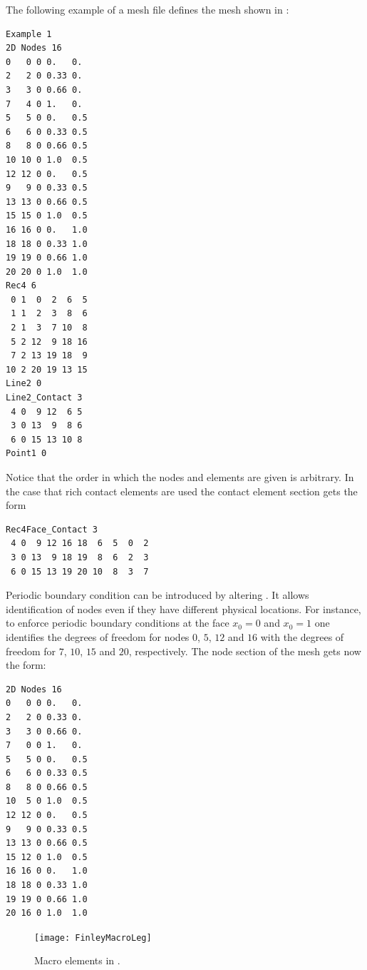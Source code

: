 The following example of a mesh file defines the mesh shown in :
\begin{verbatim}
Example 1
2D Nodes 16
0   0 0 0.   0.
2   2 0 0.33 0.
3   3 0 0.66 0.
7   4 0 1.   0.
5   5 0 0.   0.5
6   6 0 0.33 0.5
8   8 0 0.66 0.5
10 10 0 1.0  0.5
12 12 0 0.   0.5
9   9 0 0.33 0.5
13 13 0 0.66 0.5
15 15 0 1.0  0.5
16 16 0 0.   1.0
18 18 0 0.33 1.0
19 19 0 0.66 1.0
20 20 0 1.0  1.0
Rec4 6
 0 1  0  2  6  5
 1 1  2  3  8  6
 2 1  3  7 10  8
 5 2 12  9 18 16
 7 2 13 19 18  9
10 2 20 19 13 15
Line2 0
Line2_Contact 3
 4 0  9 12  6 5
 3 0 13  9  8 6
 6 0 15 13 10 8
Point1 0
\end{verbatim}
Notice that the order in which the nodes and elements are given is arbitrary.
In the case that rich contact elements are used the contact element section gets
 the form
\begin{verbatim}
Rec4Face_Contact 3
 4 0  9 12 16 18  6  5  0  2
 3 0 13  9 18 19  8  6  2  3
 6 0 15 13 19 20 10  8  3  7
\end{verbatim}
Periodic boundary condition  can be introduced by altering .
It allows identification of nodes even if they have different physical locations. For instance, to
enforce periodic boundary conditions at the face $x_0=0$ and $x_0=1$ one identifies
the degrees of freedom for nodes $0$, $5$, $12$ and $16$ with the degrees of freedom for
$7$, $10$, $15$ and $20$, respectively. The node section of the \finley mesh gets now the form:
\begin{verbatim}
2D Nodes 16
0   0 0 0.   0.
2   2 0 0.33 0.
3   3 0 0.66 0.
7   0 0 1.   0.
5   5 0 0.   0.5
6   6 0 0.33 0.5
8   8 0 0.66 0.5
10  5 0 1.0  0.5
12 12 0 0.   0.5
9   9 0 0.33 0.5
13 13 0 0.66 0.5
15 12 0 1.0  0.5
16 16 0 0.   1.0
18 18 0 0.33 1.0
19 19 0 0.66 1.0
20 16 0 1.0  1.0
\end{verbatim}

\clearpage

\clearpage

\begin{figure}[th]
\begin{center}
\texttt{[image: FinleyMacroLeg]}
\end{center}
Macro elements in \finley.
\end{figure}

